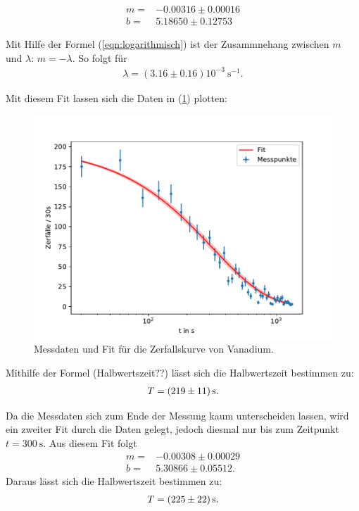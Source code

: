 \begin{align*}
    m =& -0.00316 \pm 0.00016 \\
    b =& 5.18650 \pm  0.12753
\end{align*}

Mit Hilfe der Formel (\ref{eqn:logarithmisch}) ist der Zusammnehang zwischen $m$ und $\lambda$: $m = -\lambda$.
So folgt für 
\begin{align*}
	\lambda = (3.16 \pm 0.16) 10^{-3} \  \si{\second}^{-1}.
\end{align*}

Mit diesem Fit lassen sich die Daten in (\ref{fig:zerfallskurve3}) plotten:

\begin{figure}[H]
	\centering
	\includegraphics{Daten/Vanadium.pdf}
	\caption{Messdaten und Fit für die Zerfallskurve von Vanadium.}
	\label{fig:zerfallskurve3}
\end{figure}
\noindent

Mithilfe der Formel (Halbwertszeit??) lässt sich die Halbwertszeit bestimmen zu:
\begin{align*}
	T = \SI{219\pm11}{\second}.
\end{align*}
\noindent

Da die Messdaten sich zum Ende der Messung kaum unterscheiden lassen, wird ein zweiter Fit durch die Daten gelegt, jedoch diesmal nur bis zum Zeitpunkt $t = \SI{300}{\second}$. Aus diesem
Fit folgt 
\begin{align*}
    m =& -0.00308 \pm 0.00029 \\
    b =& 5.30866 \pm  0.05512.
\end{align*}
\noindent
Daraus lässt sich die Halbwertszeit bestimmen zu:
\begin{align*}
	T = \SI{225\pm22}{\second}.
\end{align*}

